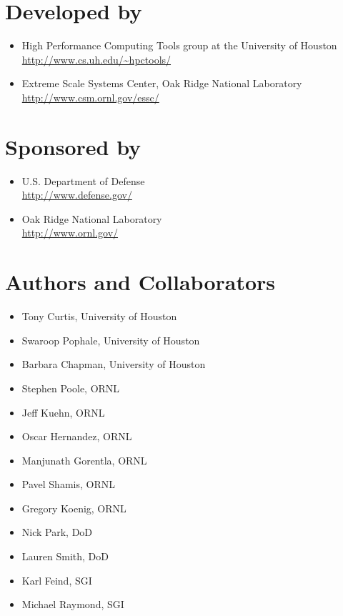 \vfill{}

\section*{Developed by}
\begin{itemize}
\item High Performance Computing Tools group at the University of Houston\\
  \url{http://www.cs.uh.edu/~hpctools/} 
\item Extreme Scale Systems Center, Oak Ridge National Laboratory\\
  \url{http://www.csm.ornl.gov/essc/} 
\end{itemize}
\pagebreak{}

\section*{Sponsored by}
\begin{itemize}
\item U.S. Department of Defense\\
  \url{http://www.defense.gov/ }
\item Oak Ridge National Laboratory\\
  \url{http://www.ornl.gov/} 
\end{itemize}

\section*{Authors and Collaborators}
\begin{itemize}
\item Tony Curtis, University of Houston
\item Swaroop Pophale, University of Houston
\item Barbara Chapman, University of Houston
\item Stephen Poole, ORNL
\item Jeff Kuehn, ORNL
\item Oscar Hernandez, ORNL
\item Manjunath Gorentla, ORNL
\item Pavel Shamis, ORNL
\item Gregory Koenig, ORNL
\item Nick Park, DoD
\item Lauren Smith, DoD
\item Karl Feind, SGI
\item Michael Raymond, SGI
\end{itemize}

